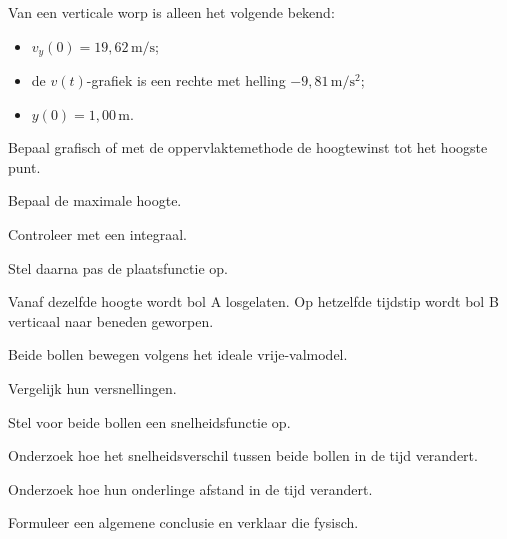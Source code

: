 \documentclass{ximera}
\begin{document}
\begin{oefening}{\oefU\ESS}

Van een verticale worp is alleen het volgende bekend:

\begin{itemize}
  \item $v_y(0)=19,62\,\mathrm{m/s}$;
  \item de $v(t)$-grafiek is een rechte met helling
        $-9,81\,\mathrm{m/s^2}$;
  \item $y(0)=1,00\,\mathrm{m}$.
\end{itemize}

\begin{question}
Bepaal grafisch of met de oppervlaktemethode de hoogtewinst tot het
hoogste punt.
\end{question}

\begin{question}
Bepaal de maximale hoogte.
\end{question}

\begin{question}
Controleer met een integraal.
\end{question}

\begin{question}
Stel daarna pas de plaatsfunctie op.
\end{question}

\end{oefening}


\begin{oefening}{\oefG}

Vanaf dezelfde hoogte wordt bol A losgelaten. Op hetzelfde tijdstip
wordt bol B verticaal naar beneden geworpen.

Beide bollen bewegen volgens het ideale vrije-valmodel.

\begin{question}
Vergelijk hun versnellingen.
\end{question}

\begin{question}
Stel voor beide bollen een snelheidsfunctie op.
\end{question}

\begin{question}
Onderzoek hoe het snelheidsverschil tussen beide bollen in de tijd
verandert.
\end{question}

\begin{question}
Onderzoek hoe hun onderlinge afstand in de tijd verandert.
\end{question}

\begin{question}
Formuleer een algemene conclusie en verklaar die fysisch.
\end{question}

\end{oefening}
\end{document}
